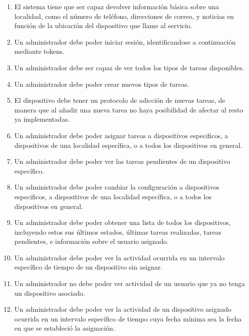 \begin{enumerate}[label=RF\arabic* -]
    \item El sistema tiene que ser capaz devolver información básica sobre una localidad, como el número de teléfono, direcciones de correo, y noticias en función de la ubicación del dispositivo que llame al servicio.
    
    \item Un administrador debe poder iniciar sesión, identificandose a continuación mediante tokens.
    
    \item Un administrador debe ser capaz de ver todos los tipos de tareas disponibles.
    
    \item Un administrador debe poder crear nuevos tipos de tareas.
    
    \item El dispositivo debe tener un protocolo de adicción de nuevas tareas, de manera que al añadir una nueva tarea no haya posibilidad de afectar al resto ya implementadas.
    
    \item Un administrador debe poder asignar tareas a dispositivos especificos, a dispositivos de una localidad específica, o a todos los dispositivos en general.
    
    \item Un administrador debe poder ver las tareas pendientes de un dispositivo específico.
    
    \item Un administrador debe poder cambiar la configuración a dispositivos especificos, a dispositivos de una localidad específica, o a todos los dispositivos en general.
    
    \item Un administrador debe poder obtener una lista de todos los dispositivos, incluyendo estos sus últimos estados, últimas tareas realizadas, tareas pendientes, e información sobre el usuario asignado.
    
    \item Un administrador debe poder ver la actividad ocurrida en un intervalo específico de tiempo de un dispositivo sin asignar.
    
    \item Un administrador no debe poder ver actividad de un usuario que ya no tenga un dispositivo asociado.
    
    \item Un administrador debe poder ver la actividad de un dispositivo asignado ocurrida en un intervalo específico de tiempo cuya fecha mínima sea la fecha en que se estableció la asignación.
    

\end{enumerate}
